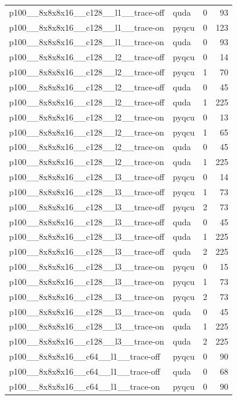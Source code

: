\begin{table}[htbp]
\begin{tabular}{@{}llrr@{}}
p100\_\_8x8x8x16\_\_c128\_\_l1\_\_trace-off & quda & 0 & 93 \\
p100\_\_8x8x8x16\_\_c128\_\_l1\_\_trace-on & pyqcu & 0 & 123 \\
p100\_\_8x8x8x16\_\_c128\_\_l1\_\_trace-on & quda & 0 & 93 \\
p100\_\_8x8x8x16\_\_c128\_\_l2\_\_trace-off & pyqcu & 0 & 14 \\
p100\_\_8x8x8x16\_\_c128\_\_l2\_\_trace-off & pyqcu & 1 & 70 \\
p100\_\_8x8x8x16\_\_c128\_\_l2\_\_trace-off & quda & 0 & 45 \\
p100\_\_8x8x8x16\_\_c128\_\_l2\_\_trace-off & quda & 1 & 225 \\
p100\_\_8x8x8x16\_\_c128\_\_l2\_\_trace-on & pyqcu & 0 & 13 \\
p100\_\_8x8x8x16\_\_c128\_\_l2\_\_trace-on & pyqcu & 1 & 65 \\
p100\_\_8x8x8x16\_\_c128\_\_l2\_\_trace-on & quda & 0 & 45 \\
p100\_\_8x8x8x16\_\_c128\_\_l2\_\_trace-on & quda & 1 & 225 \\
p100\_\_8x8x8x16\_\_c128\_\_l3\_\_trace-off & pyqcu & 0 & 14 \\
p100\_\_8x8x8x16\_\_c128\_\_l3\_\_trace-off & pyqcu & 1 & 73 \\
p100\_\_8x8x8x16\_\_c128\_\_l3\_\_trace-off & pyqcu & 2 & 73 \\
p100\_\_8x8x8x16\_\_c128\_\_l3\_\_trace-off & quda & 0 & 45 \\
p100\_\_8x8x8x16\_\_c128\_\_l3\_\_trace-off & quda & 1 & 225 \\
p100\_\_8x8x8x16\_\_c128\_\_l3\_\_trace-off & quda & 2 & 225 \\
p100\_\_8x8x8x16\_\_c128\_\_l3\_\_trace-on & pyqcu & 0 & 15 \\
p100\_\_8x8x8x16\_\_c128\_\_l3\_\_trace-on & pyqcu & 1 & 73 \\
p100\_\_8x8x8x16\_\_c128\_\_l3\_\_trace-on & pyqcu & 2 & 73 \\
p100\_\_8x8x8x16\_\_c128\_\_l3\_\_trace-on & quda & 0 & 45 \\
p100\_\_8x8x8x16\_\_c128\_\_l3\_\_trace-on & quda & 1 & 225 \\
p100\_\_8x8x8x16\_\_c128\_\_l3\_\_trace-on & quda & 2 & 225 \\
p100\_\_8x8x8x16\_\_c64\_\_l1\_\_trace-off & pyqcu & 0 & 90 \\
p100\_\_8x8x8x16\_\_c64\_\_l1\_\_trace-off & quda & 0 & 68 \\
p100\_\_8x8x8x16\_\_c64\_\_l1\_\_trace-on & pyqcu & 0 & 90 \\

\end{tabular}
\end{table}
